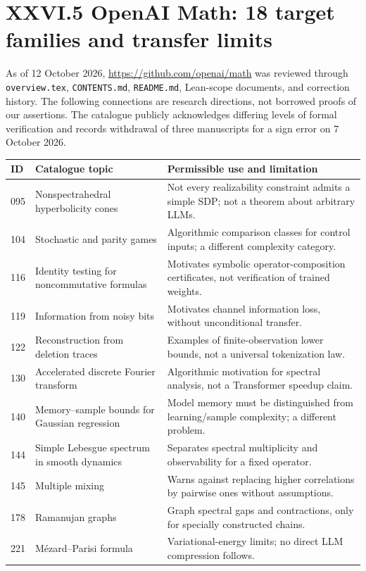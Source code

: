 \documentclass[11pt,a4paper,oneside]{book}
\begin{document}
\section*{XXVI.5 OpenAI Math: 18 target families and transfer limits}
As of 12 October 2026, \url{https://github.com/openai/math} was reviewed through \texttt{overview.tex}, \texttt{CONTENTS.md}, \texttt{README.md}, Lean-scope documents, and correction history. The following connections are research directions, not borrowed proofs of our assertions. The catalogue publicly acknowledges differing levels of formal verification and records withdrawal of three manuscripts for a sign error on 7 October 2026.
\small
\begin{longtable}{@{}p{}p{}p{}@{}}
\toprule ID&Catalogue topic&Permissible use and limitation\\\midrule\endhead
095&Nonspectrahedral hyperbolicity cones&Not every realizability constraint admits a simple SDP; not a theorem about arbitrary LLMs.\\
104&Stochastic and parity games&Algorithmic comparison classes for control inputs; a different complexity category.\\
116&Identity testing for noncommutative formulas&Motivates symbolic operator-composition certificates, not verification of trained weights.\\
119&Information from noisy bits&Motivates channel information loss, without unconditional transfer.\\
122&Reconstruction from deletion traces&Examples of finite-observation lower bounds, not a universal tokenization law.\\
130&Accelerated discrete Fourier transform&Algorithmic motivation for spectral analysis, not a Transformer speedup claim.\\
140&Memory--sample bounds for Gaussian regression&Model memory must be distinguished from learning/sample complexity; a different problem.\\
144&Simple Lebesgue spectrum in smooth dynamics&Separates spectral multiplicity and observability for a fixed operator.\\
145&Multiple mixing&Warns against replacing higher correlations by pairwise ones without assumptions.\\
178&Ramanujan graphs&Graph spectral gaps and contractions, only for specially constructed chains.\\
221&M\'ezard--Parisi formula&Variational-energy limits; no direct LLM compression follows.\\

\end{longtable}
\end{document}
